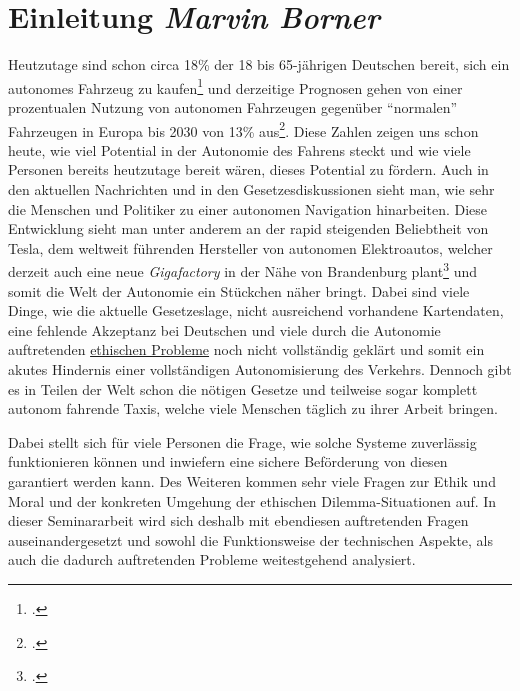 \documentclass[a4paper, 12pt, openany]{book}
\newcommand\Chapter[2]{\chapter[#1 {\scriptsize\itshape#2}]{#1 \footnotesize\itshape#2}}
\begin{document}
    
    
    
    {
        \hypersetup{linkcolor=black}
        \tableofcontents
    }

    \Chapter{Einleitung}{Marvin Borner}
        Heutzutage sind schon circa 18\% der 18 bis 65-jährigen Deutschen bereit, sich ein autonomes Fahrzeug zu kaufen\footcite{statistagermans} und derzeitige Prognosen gehen von einer prozentualen Nutzung von autonomen Fahrzeugen gegenüber \enquote{normalen} Fahrzeugen in Europa bis 2030 von 13\% aus\footcite{statistaeurope}. Diese Zahlen zeigen uns schon heute, wie viel Potential in der Autonomie des Fahrens steckt und wie viele Personen bereits heutzutage bereit wären, dieses Potential zu fördern. Auch in den aktuellen Nachrichten und in den Gesetzesdiskussionen sieht man, wie sehr die Menschen und Politiker zu einer autonomen Navigation hinarbeiten. Diese Entwicklung sieht man unter anderem an der rapid steigenden Beliebtheit von Tesla, dem weltweit führenden Hersteller von autonomen Elektroautos, welcher derzeit auch eine neue \textit{Gigafactory} in der Nähe von Brandenburg plant\footcite{zeitgigafac} und somit die Welt der Autonomie ein Stückchen näher bringt. Dabei sind viele Dinge, wie die aktuelle Gesetzeslage, nicht ausreichend vorhandene Kartendaten, eine fehlende Akzeptanz bei Deutschen und viele durch die Autonomie auftretenden \hyperref[dilemmata]{ethischen Probleme} noch nicht vollständig geklärt und somit ein akutes Hindernis einer vollständigen Autonomisierung des Verkehrs. Dennoch gibt es in Teilen der Welt schon die nötigen Gesetze und teilweise sogar komplett autonom fahrende Taxis, welche viele Menschen täglich zu ihrer Arbeit bringen.\par
        Dabei stellt sich für viele Personen die Frage, wie solche Systeme zuverlässig funktionieren können und inwiefern eine sichere Beförderung von diesen garantiert werden kann. Des Weiteren kommen sehr viele Fragen zur Ethik und Moral und der konkreten Umgehung der ethischen Dilemma-Situationen auf. In dieser Seminararbeit wird sich deshalb mit ebendiesen auftretenden Fragen auseinandergesetzt und sowohl die Funktionsweise der technischen Aspekte, als auch die dadurch auftretenden Probleme weitestgehend analysiert.
    
\end{document}
